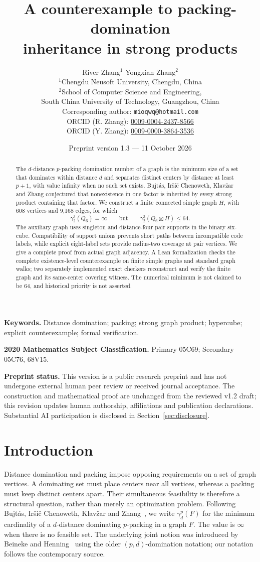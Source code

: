 \documentclass[11pt]{article}
\title{A counterexample to packing-domination\\
inheritance in strong products}
\author{River Zhang$^{1}$ \qquad Yongxian Zhang$^{2}$\\[6pt]
\small $^{1}$Chengdu Neusoft University, Chengdu, China\\
\small $^{2}$School of Computer Science and Engineering,\\
\small South China University of Technology, Guangzhou, China\\[5pt]
\small Corresponding author: \texttt{mioqwq@hotmail.com}\\
\small ORCID (R. Zhang): \href{https://orcid.org/0009-0004-2437-8566}{0009-0004-2437-8566}\\
\small ORCID (Y. Zhang): \href{https://orcid.org/0009-0000-3864-3536}{0009-0000-3864-3536}}
\date{Preprint version 1.3 --- 11 October 2026}
\theoremstyle{definition}
\theoremstyle{remark}
\begin{document}
\maketitle
\begin{abstract}
The \(d\)-distance \(p\)-packing domination number of a graph is the
minimum size of a set that dominates within distance \(d\) and separates
distinct centers by distance at least \(p+1\), with value infinity when no
such set exists. Bujt\'as, Ir\v si\v c Chenoweth, Klav\v zar and Zhang
conjectured that nonexistence in one factor is inherited by every strong
product containing that factor. We construct a finite connected simple
graph \(H\), with 608 vertices and 9,168 edges, for which
\[
 \gamma_2^3(Q_6)=\infty
 \qquad\text{but}\qquad
 \gamma_2^3(Q_6\boxtimes H)\le 64.
\]
The auxiliary graph uses singleton and distance-four pair supports in
the binary six-cube. Compatibility of support unions prevents short
paths between incompatible code labels, while explicit eight-label
sets provide radius-two coverage at pair vertices. We give a complete
proof from actual graph adjacency. A Lean formalization checks the
complete existence-level counterexample on finite simple graphs and
standard graph walks; two separately implemented exact checkers
reconstruct and verify the finite graph and its same-center covering
witness. The numerical minimum is not claimed to be 64, and historical
priority is not asserted.
\end{abstract}
\noindent\textbf{Keywords.} Distance domination; packing; strong graph
product; hypercube; explicit counterexample; formal verification.
\par\noindent\textbf{2020 Mathematics Subject Classification.}
Primary 05C69; Secondary 05C76, 68V15.

\medskip
\noindent\textbf{Preprint status.} This version is a public research
preprint and has not undergone external human peer review or received
journal acceptance. The construction and mathematical proof are unchanged
from the reviewed v1.2 draft; this revision updates human authorship,
affiliations and publication declarations. Substantial AI participation is
disclosed in Section~\ref{sec:disclosure}.

\section{Introduction}\label{sec:introduction}
Distance domination and packing impose opposing requirements on a set of
graph vertices. A dominating set must place centers near all vertices,
whereas a packing must keep distinct centers apart. Their simultaneous
feasibility is therefore a structural question, rather than merely an
optimization problem. Following Bujt\'as, Ir\v si\v c Chenoweth,
Klav\v zar and Zhang~\cite{bickz-strong}, we write
\(\gamma_d^p(F)\) for the minimum cardinality of a \(d\)-distance
dominating \(p\)-packing in a graph \(F\). The value is \(\infty\) when
there is no feasible set.
The underlying joint notion was introduced by Beineke and
Henning~\cite{beineke-henning} using the older
\((p,d)\)-domination notation; our notation follows the contemporary
source.
\end{document}
